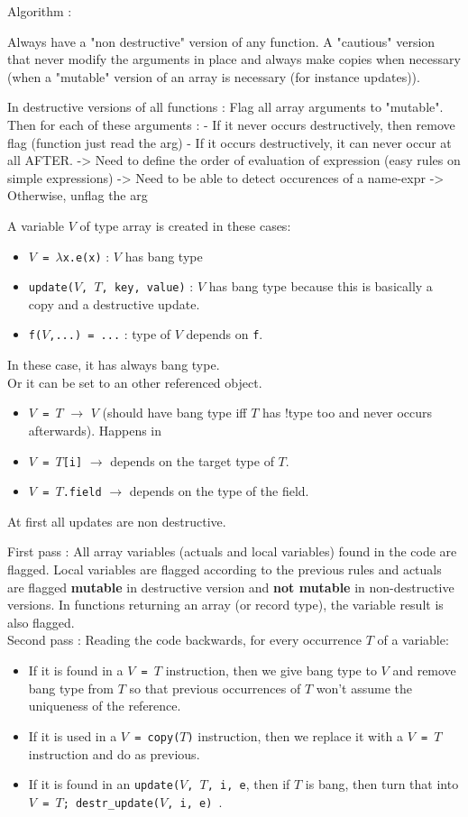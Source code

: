 \documentclass[12pt,a4paper,titlepage]{article}
\newcommand{\cl}[1]{\texttt{#1}}
\begin{document}
Algorithm :

Always have a "non destructive" version of any function. A "cautious" version that never modify the arguments in place and always make copies when necessary (when a "mutable" version of an array is necessary (for instance updates)).

In destructive versions of all functions :
Flag all array arguments to "mutable".
Then for each of these arguments :
  - If it never occurs destructively, then remove flag
          (function just read the arg)
  - If it occurs destructively, it can never occur at all AFTER.
  -> Need to define the order of evaluation of expression
      (easy rules on simple expressions)
  -> Need to be able to detect occurences of a name-expr
  -> Otherwise, unflag the arg

A variable $V$ of type array is created in these cases:
\begin{itemize}
\item \cl{$V$ = $\lambda$x.e(x)} : $V$ has bang type
\item \cl{update($V$, $T$, key, value)} : $V$ has bang type because this is basically a copy and a destructive update.
\item \cl{f($V$,...) = ...} : type of $V$ depends on \cl{f}.
\end{itemize}
In these case, it has always bang type.\\
Or it can be set to an other referenced object.
\begin{itemize}
\item \cl{$V$ = $T$} $\rightarrow$ $V$ (should have bang type iff $T$ has !type too and never occurs afterwards). Happens in 
\item \cl{$V$ = $T$[i]} $\rightarrow$ depends on the target type of $T$.
\item \cl{$V$ = $T$.field} $\rightarrow$ depends on the type of the field.
\end{itemize}
At first all updates are non destructive.

First pass : All array variables (actuals and local variables) found in the code are flagged. Local variables are flagged according to the previous rules and actuals are flagged \textbf{mutable} in destructive version and \textbf{not mutable} in non-destructive versions. In functions returning an array (or record type), the variable result is also flagged.\\

Second pass :
Reading the code backwards, for every occurrence $T$ of a variable:
\begin{itemize}
\item If it is found in a \cl{$V$ = $T$} instruction, then we give bang type to $V$ and remove bang type from $T$ so that previous occurrences of $T$ won't assume the uniqueness of the reference.
\item If it is used in a \cl{$V$ = copy($T$)} instruction, then we replace it with a \cl{$V$ = $T$} instruction and do as previous.
\item  If it is found in an \cl{update($V$, $T$, i, e}, then if $T$ is bang, then turn that into \cl{$V$ = $T$; destr\_update($V$, i, e) }.
\end{itemize}
\end{document}
